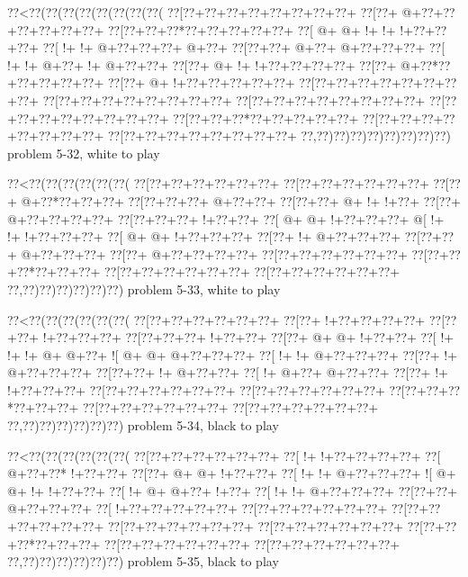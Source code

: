 \vbox{\vbox{\goo
\0??<\0??(\0??(\0??(\0??(\0??(\0??(\0??(\0??(
\0??[\0??+\0??+\0??+\0??+\0??+\0??+\0??+\0??+
\0??[\0??+\- @+\0??+\0??+\0??+\0??+\0??+\0??+
\0??[\0??+\0??+\0??*\0??+\0??+\0??+\0??+\0??+
\0??[\- @+\- @+\- !+\- !+\- !+\0??+\0??+\0??+
\0??[\- !+\- !+\- @+\0??+\0??+\0??+\- @+\0??+
\0??[\0??+\0??+\- @+\0??+\- @+\0??+\0??+\0??+
\0??[\- !+\- !+\- @+\0??+\- !+\- @+\0??+\0??+
\0??[\0??+\- @+\- !+\- !+\0??+\0??+\0??+\0??+
\0??[\0??+\- @+\0??*\0??+\0??+\0??+\0??+\0??+
\0??[\0??+\- @+\- !+\0??+\0??+\0??+\0??+\0??+
\0??[\0??+\0??+\0??+\0??+\0??+\0??+\0??+\0??+
\0??[\0??+\0??+\0??+\0??+\0??+\0??+\0??+\0??+
\0??[\0??+\0??+\0??+\0??+\0??+\0??+\0??+\0??+
\0??[\0??+\0??+\0??+\0??+\0??+\0??+\0??+\0??+
\0??[\0??+\0??+\0??*\0??+\0??+\0??+\0??+\0??+
\0??[\0??+\0??+\0??+\0??+\0??+\0??+\0??+\0??+
\0??[\0??+\0??+\0??+\0??+\0??+\0??+\0??+\0??+
\0??,\0??)\0??)\0??)\0??)\0??)\0??)\0??)\0??)
}
\hfil problem 5-32, white to play\hfil\break
}

\vbox{\vbox{\goo
\0??<\0??(\0??(\0??(\0??(\0??(\0??(
\0??[\0??+\0??+\0??+\0??+\0??+\0??+
\0??[\0??+\0??+\0??+\0??+\0??+\0??+
\0??[\0??+\- @+\0??*\0??+\0??+\0??+
\0??[\0??+\0??+\0??+\- @+\0??+\0??+
\0??[\0??+\0??+\- @+\- !+\- !+\0??+
\0??[\0??+\- @+\0??+\0??+\0??+\0??+
\0??[\0??+\0??+\0??+\- !+\0??+\0??+
\0??[\- @+\- @+\- !+\0??+\0??+\0??+
\- @[\- !+\- !+\- !+\0??+\0??+\0??+
\0??[\- @+\- @+\- !+\0??+\0??+\0??+
\0??[\0??+\- !+\- @+\0??+\0??+\0??+
\0??[\0??+\0??+\- @+\0??+\0??+\0??+
\0??[\0??+\- @+\0??+\0??+\0??+\0??+
\0??[\0??+\0??+\0??+\0??+\0??+\0??+
\0??[\0??+\0??+\0??*\0??+\0??+\0??+
\0??[\0??+\0??+\0??+\0??+\0??+\0??+
\0??[\0??+\0??+\0??+\0??+\0??+\0??+
\0??,\0??)\0??)\0??)\0??)\0??)\0??)
}
\hfil problem 5-33, white to play\hfil\break
}

\vbox{\vbox{\goo
\0??<\0??(\0??(\0??(\0??(\0??(\0??(
\0??[\0??+\0??+\0??+\0??+\0??+\0??+
\0??[\0??+\- !+\0??+\0??+\0??+\0??+
\0??[\0??+\0??+\- !+\0??+\0??+\0??+
\0??[\0??+\0??+\0??+\- !+\0??+\0??+
\0??[\0??+\- @+\- @+\- !+\0??+\0??+
\0??[\- !+\- !+\- !+\- @+\- @+\0??+
\- ![\- @+\- @+\- @+\0??+\0??+\0??+
\0??[\- !+\- !+\- @+\0??+\0??+\0??+
\0??[\0??+\- !+\- @+\0??+\0??+\0??+
\0??[\0??+\0??+\- !+\- @+\0??+\0??+
\0??[\- !+\- @+\0??+\- @+\0??+\0??+
\0??[\0??+\- !+\- !+\0??+\0??+\0??+
\0??[\0??+\0??+\0??+\0??+\0??+\0??+
\0??[\0??+\0??+\0??+\0??+\0??+\0??+
\0??[\0??+\0??+\0??*\0??+\0??+\0??+
\0??[\0??+\0??+\0??+\0??+\0??+\0??+
\0??[\0??+\0??+\0??+\0??+\0??+\0??+
\0??,\0??)\0??)\0??)\0??)\0??)\0??)
}
\hfil problem 5-34, black to play\hfil\break
}

\vbox{\vbox{\goo
\0??<\0??(\0??(\0??(\0??(\0??(\0??(
\0??[\0??+\0??+\0??+\0??+\0??+\0??+
\0??[\- !+\- !+\0??+\0??+\0??+\0??+
\0??[\- @+\0??+\0??*\- !+\0??+\0??+
\0??[\0??+\- @+\- @+\- !+\0??+\0??+
\0??[\- !+\- !+\- @+\0??+\0??+\0??+
\- ![\- @+\- @+\- !+\- !+\0??+\0??+
\0??[\- !+\- @+\- @+\0??+\- !+\0??+
\0??[\- !+\- !+\- @+\0??+\0??+\0??+
\0??[\0??+\0??+\- @+\0??+\0??+\0??+
\0??[\- !+\0??+\0??+\0??+\0??+\0??+
\0??[\0??+\0??+\0??+\0??+\0??+\0??+
\0??[\0??+\0??+\0??+\0??+\0??+\0??+
\0??[\0??+\0??+\0??+\0??+\0??+\0??+
\0??[\0??+\0??+\0??+\0??+\0??+\0??+
\0??[\0??+\0??+\0??*\0??+\0??+\0??+
\0??[\0??+\0??+\0??+\0??+\0??+\0??+
\0??[\0??+\0??+\0??+\0??+\0??+\0??+
\0??,\0??)\0??)\0??)\0??)\0??)\0??)
}
\hfil problem 5-35, black to play\hfil\break
}

